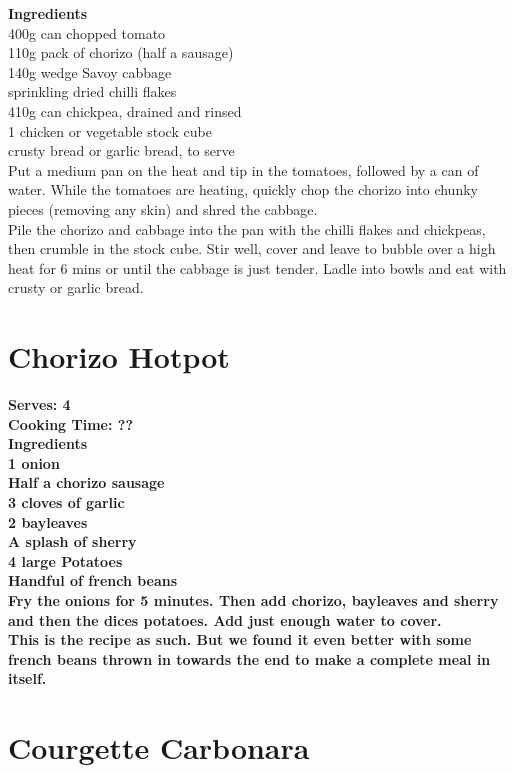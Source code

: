 \documentclass[18pt, oneside]{book}
\begin{document}
\textbf{Ingredients} \\
400g can chopped tomato \\
110g pack of chorizo (half a sausage) \\
140g wedge Savoy cabbage \\
sprinkling dried chilli flakes \\
410g can chickpea, drained and rinsed \\
1 chicken or vegetable stock cube \\
crusty bread or garlic bread, to serve \\
 
Put a medium pan on the heat and tip in the tomatoes, followed by a can of water. While the tomatoes are heating, quickly chop the chorizo into chunky pieces (removing any skin) and shred the cabbage. \\

Pile the chorizo and cabbage into the pan with the chilli flakes and chickpeas, then crumble in the stock cube. Stir well, cover and leave to bubble over a high heat for 6 mins or until the cabbage is just tender. Ladle into bowls and eat with crusty or garlic bread.

\section{Chorizo Hotpot}

\bf{Serves: 4} \\
\bf{Cooking Time: ??} \\ 

\bf{Ingredients} \normalfont \\
1 onion \\
Half a chorizo sausage \\
3 cloves of garlic \\
2 bayleaves \\
A splash of sherry \\ 
4 large Potatoes \\
Handful of french beans \\

Fry the onions for 5 minutes. Then add chorizo, bayleaves and sherry and then the dices potatoes. Add just enough water to cover. \\

This is the recipe as such. But we found it even better with some french beans thrown in towards the end to make a complete meal in itself.

\section{Courgette Carbonara}
\end{document}
